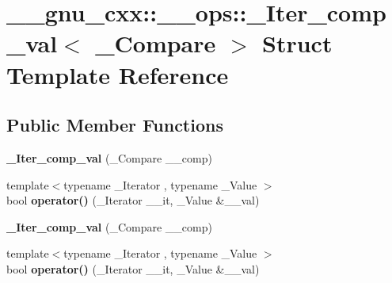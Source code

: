 \hypertarget{struct____gnu__cxx_1_1____ops_1_1__Iter__comp__val}{\section{\+\_\+\+\_\+gnu\+\_\+cxx\+:\+:\+\_\+\+\_\+ops\+:\+:\+\_\+\+Iter\+\_\+comp\+\_\+val$<$ \+\_\+\+Compare $>$ Struct Template Reference}
\label{struct____gnu__cxx_1_1____ops_1_1__Iter__comp__val}
}
\subsection*{Public Member Functions}
\begin{DoxyCompactItemize}
\item 
\hypertarget{struct____gnu__cxx_1_1____ops_1_1__Iter__comp__val_a8222963c14b29567f9ee53dc7335d419}{{\bfseries \+\_\+\+Iter\+\_\+comp\+\_\+val} (\+\_\+\+Compare \+\_\+\+\_\+comp)}\label{struct____gnu__cxx_1_1____ops_1_1__Iter__comp__val_a8222963c14b29567f9ee53dc7335d419}

\item 
\hypertarget{struct____gnu__cxx_1_1____ops_1_1__Iter__comp__val_a55a0d1dd83f53c036291fde8d6a08dcb}{{\footnotesize template$<$typename \+\_\+\+Iterator , typename \+\_\+\+Value $>$ }\\bool {\bfseries operator()} (\+\_\+\+Iterator \+\_\+\+\_\+it, \+\_\+\+Value \&\+\_\+\+\_\+val)}\label{struct____gnu__cxx_1_1____ops_1_1__Iter__comp__val_a55a0d1dd83f53c036291fde8d6a08dcb}

\item 
\hypertarget{struct____gnu__cxx_1_1____ops_1_1__Iter__comp__val_a8222963c14b29567f9ee53dc7335d419}{{\bfseries \+\_\+\+Iter\+\_\+comp\+\_\+val} (\+\_\+\+Compare \+\_\+\+\_\+comp)}\label{struct____gnu__cxx_1_1____ops_1_1__Iter__comp__val_a8222963c14b29567f9ee53dc7335d419}

\item 
\hypertarget{struct____gnu__cxx_1_1____ops_1_1__Iter__comp__val_a55a0d1dd83f53c036291fde8d6a08dcb}{{\footnotesize template$<$typename \+\_\+\+Iterator , typename \+\_\+\+Value $>$ }\\bool {\bfseries operator()} (\+\_\+\+Iterator \+\_\+\+\_\+it, \+\_\+\+Value \&\+\_\+\+\_\+val)}\label{struct____gnu__cxx_1_1____ops_1_1__Iter__comp__val_a55a0d1dd83f53c036291fde8d6a08dcb}

\end{DoxyCompactItemize}
